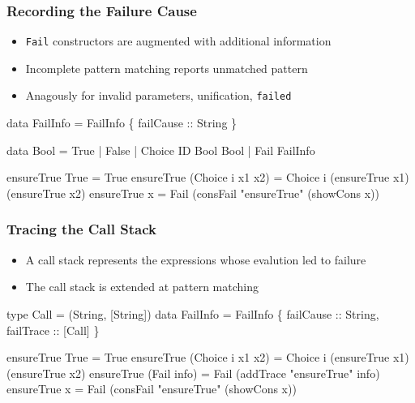 \documentclass[
,xcolor=dvipsnames
]{beamer}
\begin{document}
\begin{frame}[fragile]%
\frametitle{Recording the Failure Cause}

\begin{itemize}
\item \verb!Fail! constructors are augmented with additional information
\item Incomplete pattern matching reports unmatched pattern
\item Anagously for invalid parameters, unification, \verb!failed!
\end{itemize}

\pause

\begin{haskell}
data FailInfo = FailInfo \{ failCause :: String \}
\end{haskell}

\begin{haskell}
data Bool = True | False | Choice ID Bool Bool | Fail \alert{FailInfo}

ensureTrue True             = True
ensureTrue (Choice i x1 x2) = Choice i (ensureTrue x1)
                                       (ensureTrue x2)
ensureTrue x                = Fail \alert{(consFail "{}ensureTrue" (showCons x))}
\end{haskell}
\end{frame}

\begin{frame}[fragile]%
\frametitle{Tracing the Call Stack}

\begin{itemize}
\item A call stack represents the expressions whose evalution led to failure
\item The call stack is extended at pattern matching
\end{itemize}

\pause

\begin{haskell}
type Call     = (String, [String])
data FailInfo = FailInfo \{ failCause :: String\alert{, failTrace ::  [Call]} \}
\end{haskell}

\begin{haskell}
ensureTrue True             = True
ensureTrue (Choice i x1 x2) = Choice i (ensureTrue x1)
                                       (ensureTrue x2)
\alert{ensureTrue (Fail info)      = Fail (addTrace "{}ensureTrue" info)}
ensureTrue x                = Fail (consFail "{}ensureTrue" (showCons x))
\end{haskell}

\end{frame}
\end{document}
